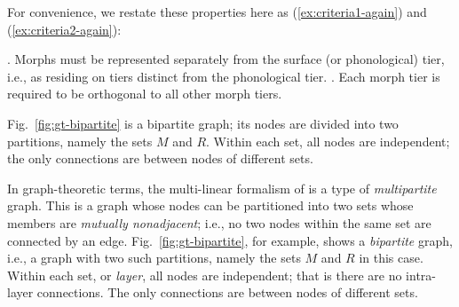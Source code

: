 For convenience, we restate these properties here as (\ref{ex:criteria1-again}) and (\ref{ex:criteria2-again}):
\begin{exe} \label{ex:criteria1-again} \ex \begin{xlist}
	.  %
	Morphs must be represented separately 
	from the surface (or phonological) tier, i.e., as residing on tiers distinct from 
	the phonological tier. \label{ex:criteria1-again}%
	.
	Each morph tier is required to be orthogonal to all other morph tiers. \label{ex:criteria2-again}
	\end{xlist}
\end{exe}
Fig.~\ref{fig:gt-bipartite} is a bipartite
graph; its nodes are divided into two partitions, namely the sets $M$
and $R$. Within each set, all nodes are independent; 
the only connections are between nodes of different sets.

In graph-theoretic terms, the multi-linear formalism of
\cite{mccarthy:1981} is a type of \emph{multipartite}
graph. This is a graph whose nodes can be partitioned into two sets whose members are \emph{mutually nonadjacent}; i.e., no two nodes within the same set are connected by an edge.
Fig.~\ref{fig:gt-bipartite}, for example, shows a \emph{bipartite}
graph, i.e., a graph with two such partitions, namely the sets $M$
and $R$ in this case.
Within each set, or \emph{layer}, all nodes are independent; that is there are no
intra-layer connections. The only connections are 
between nodes of different sets.

